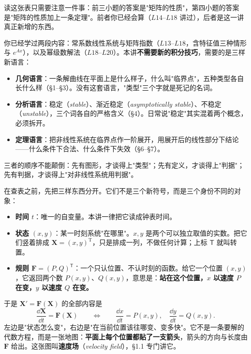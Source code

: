 \documentclass[11pt]{ctexart}
\newcommand{\X}{\mathbf{X}}\newcommand{\Y}{\mathbf{Y}}
\newcommand{\F}{\mathbf{F}}
\newcommand{\EN}[1]{\textcolor{inkgray}{\itshape #1}}
\begin{document}
读这张表只需要注意一件事：前三小题的答案是"矩阵的性质"，第四小题的答案是"矩阵的性质加上一条定理"。前者你已经会算（$L14$--$L18$ 讲过），后者是这一讲真正新增的东西。


你已经学过两段内容：常系数线性系统与矩阵指数（$L13$--$L18$，含特征值三种情形与 $e^{Ax}$），以及幂级数解法（$L18$--$L20$）。本讲\textbf{不需要新的积分技巧}，需要的是三样新语言：

\begin{itemize}
\item \textbf{几何语言}：一条解曲线在平面上是什么样子，什么叫"临界点"，五种类型各自长什么样（§1--§3）。没有这套语言，"类型"三个字就是死记的名词。
\item \textbf{分析语言}：稳定（\EN{stable}）、渐近稳定（\EN{asymptotically stable}）、不稳定（\EN{unstable}），三个词各自的严格含义（§4）。日常说"稳定"其实混着两个概念，必须拆开。
\item \textbf{定理语言}：把非线性系统在临界点作一阶展开，用展开后的线性部分下结论——什么条件下合法、什么条件下失效（§6--§7）。
\end{itemize}

三者的顺序不能颠倒：先有图形，才谈得上"类型"；先有定义，才谈得上"判据"；先有判据，才谈得上"对非线性系统用判据"。


在查表之前，先把三样东西分开。它们不是三个新符号，而是三个身份不同的对象：

\begin{itemize}
\item \textbf{时间 $t$}：唯一的自变量。本讲一律把它读成钟表时间。
\item \textbf{状态 $(x,y)$}：某一时刻系统"在哪里"。$x,y$ 是两个可以独立取值的实数。把它们竖着排成 $\X=(x,y)^{\mathrm T}$，只是排成一列，不做任何计算；上标 $\mathsf T$ 就叫转置。
\item \textbf{规则 $\F=(P,Q)^{\mathsf T}$}：一个只认位置、不认时刻的函数。给它一个位置 $(x,y)$，它返回两个数 $P(x,y)$、$Q(x,y)$，意思是：\textbf{站在这个位置，$x$ 以速度 $P$ 在变，$y$ 以速度 $Q$ 在变。}
\end{itemize}

于是 $\X'=\F(\X)$ 的全部内容是
\[
\frac{\dd\X}{\dd t}=\F(\X)
\qquad\Longleftrightarrow\qquad
\frac{\dd x}{\dd t}=P(x,y),\quad
\frac{\dd y}{\dd t}=Q(x,y).
\]
左边是"状态怎么变"，右边是"在当前位置该往哪变、变多快"。它不是一条要解的代数方程，而是一张地图：\textbf{平面上每个位置都贴了一支箭头}，箭头的方向与长度由 $\F$ 给出。这张图叫\textbf{速度场}（\EN{velocity field}），§1.1 专门讲它。
\end{document}
